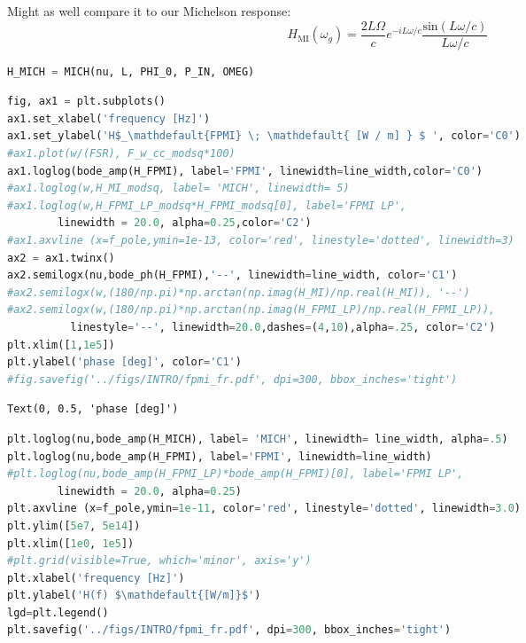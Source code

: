 \noindent Might as well compare it to our Michelson response:
\begin{equation} H_{\mathrm{MI}}(\omega_g) = \frac{2 L \Omega}{c}e^{-i L \omega / c} \frac{\mathrm{sin}(L \omega /c)}{L \omega /c} \end{equation}

\begin{spacing}{1.2} \begin{lstlisting}[frame=single, language=Python]
H_MICH = MICH(nu, L, PHI_0, P_IN, OMEG)
\end{lstlisting} \end{spacing}

\begin{spacing}{1.2} \begin{lstlisting}[frame=single, language=Python]
fig, ax1 = plt.subplots()
ax1.set_xlabel('frequency [Hz]')
ax1.set_ylabel('H$_\mathdefault{FPMI} \; \mathdefault{ [W / m] } $ ', color='C0')
#ax1.plot(w/(FSR), F_w_cc_modsq*100)
ax1.loglog(bode_amp(H_FPMI), label='FPMI', linewidth=line_width,color='C0')
#ax1.loglog(w,H_MI_modsq, label= 'MICH', linewidth= 5)
#ax1.loglog(w,H_FPMI_LP_modsq*H_FPMI_modsq[0], label='FPMI LP', 
	    linewidth = 20.0, alpha=0.25,color='C2')
#ax1.axvline (x=f_pole,ymin=1e-13, color='red', linestyle='dotted', linewidth=3)
ax2 = ax1.twinx()
ax2.semilogx(nu,bode_ph(H_FPMI),'--', linewidth=line_width, color='C1')
#ax2.semilogx(w,(180/np.pi)*np.arctan(np.imag(H_MI)/np.real(H_MI)), '--')
#ax2.semilogx(w,(180/np.pi)*np.arctan(np.imag(H_FPMI_LP)/np.real(H_FPMI_LP)),
	      linestyle='--', linewidth=20.0,dashes=(4,10),alpha=.25, color='C2')
plt.xlim([1,1e5])
plt.ylabel('phase [deg]', color='C1')
#fig.savefig('../figs/INTRO/fpmi_fr.pdf', dpi=300, bbox_inches='tight')
\end{lstlisting} \end{spacing}

\begin{spacing}{1.2} \begin{lstlisting}
Text(0, 0.5, 'phase [deg]')
\end{lstlisting} \end{spacing}

\begin{spacing}{1.2} \begin{lstlisting}[frame=single, language=Python]
plt.loglog(nu,bode_amp(H_MICH), label= 'MICH', linewidth= line_width, alpha=.5)
plt.loglog(nu,bode_amp(H_FPMI), label='FPMI', linewidth=line_width)
#plt.loglog(nu,bode_amp(H_FPMI_LP)*bode_amp(H_FPMI)[0], label='FPMI LP', 
	    linewidth = 20.0, alpha=0.25)
plt.axvline (x=f_pole,ymin=1e-11, color='red', linestyle='dotted', linewidth=3.0)
plt.ylim([5e7, 5e14])
plt.xlim([1e0, 1e5])
#plt.grid(visible=True, which='minor', axis='y')
plt.xlabel('frequency [Hz]')
plt.ylabel('H(f) $\mathdefault{[W/m]}$')
lgd=plt.legend()
plt.savefig('../figs/INTRO/fpmi_fr.pdf', dpi=300, bbox_inches='tight')
\end{lstlisting} \end{spacing}

